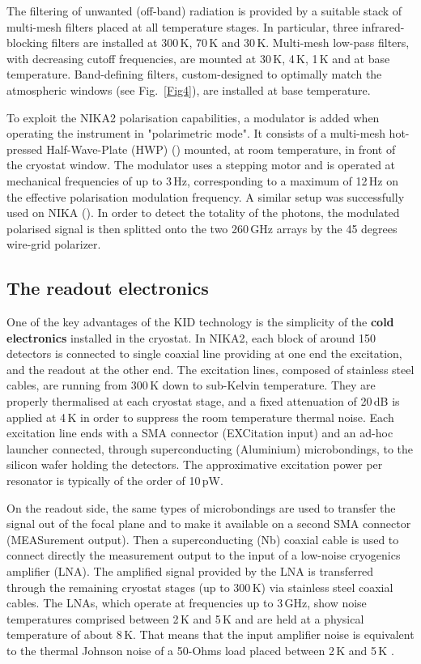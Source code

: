 \documentclass[]{aa} %
\begin{document}
The filtering of unwanted (off-band) radiation is provided by a suitable stack of multi-mesh filters placed at all temperature stages. In particular, three infrared-blocking filters are installed at 300\,K, 70\,K and 30\,K. Multi-mesh low-pass filters, with decreasing cutoff frequencies, are mounted at 30\,K, 4\,K, 1\,K and at base temperature. Band-defining filters, custom-designed to optimally match the atmospheric windows (see Fig.~\ref{Fig4}), are installed at base temperature. 

To exploit the NIKA2 polarisation capabilities, a modulator is added when operating the instrument in "polarimetric mode". It consists of a multi-mesh hot-pressed Half-Wave-Plate (HWP) (\cite{Pisano2008}) mounted, at room temperature, in front of the cryostat window. The modulator uses a stepping motor and is operated at mechanical frequencies of up to 3\,Hz, corresponding to a maximum of 12\,Hz on the effective polarisation modulation frequency. A similar setup was successfully used on NIKA (\cite{Ritacco2017}). In order to detect the totality of the photons, the modulated polarised signal is then splitted onto the two 260\,GHz arrays by the 45 degrees wire-grid polarizer.  


 \subsection{The readout electronics}

One of the key advantages of the KID technology is the simplicity of the {\bf{cold electronics}} installed in the cryostat.
In NIKA2, each block of around 150 detectors is connected to single coaxial line providing at one end the excitation, and the readout at the other end. The excitation lines, composed of stainless steel cables, are running from 300\,K down to sub-Kelvin temperature. They are properly thermalised at each cryostat stage, and a fixed attenuation of 20\,dB is applied at 4\,K in order to suppress the room temperature thermal noise. Each excitation line ends with a SMA connector (EXCitation input) and an ad-hoc launcher connected, through superconducting (Aluminium) microbondings, to the silicon wafer holding the detectors. The approximative excitation power per resonator is typically of the order of 10\,pW.

On the readout side, the same types of microbondings are used to transfer the signal out of the focal plane and to make it available on a second SMA connector (MEASurement output). Then a superconducting (Nb) coaxial cable is used to connect directly the measurement output to the input of a low-noise cryogenics amplifier (LNA). The amplified signal provided by the LNA is transferred through the remaining cryostat stages (up to 300\,K) via stainless steel coaxial cables. The LNAs, which operate at frequencies up to 3\,GHz, show noise temperatures comprised between 2\,K and 5\,K and are held at a physical temperature of about 8\,K. That means that the input amplifier noise is equivalent to the thermal Johnson noise of a 50-Ohms load placed between 2\,K and 5\,K .
\end{document}
